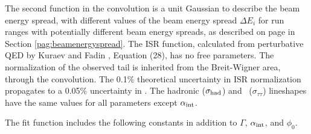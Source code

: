 \documentclass{cornell}
\begin{document}
The second function in the convolution is a unit Gaussian to describe
the beam energy spread, with different values of the beam energy
spread $\Delta E_i$ for run ranges with potentially different beam
energy spreads, as described on page \pageref{pag:beamenergyspread} in
Section \ref{pag:beamenergyspread}.  The ISR function, calculated from
perturbative QED by Kuraev and Fadin \cite{kf}, Equation (28), has no
free parameters.  The normalization of the observed tail is inherited
from the Breit-Wigner area, through the convolution.  The 0.1\%
theoretical uncertainty in ISR normalization propagates to a 0.05\%
uncertainty in \geehadtot.  The hadronic ($\sigma_{\mbox{\scriptsize had}}$) and
\tautau\ ($\sigma_{\tau\tau}$) lineshapes have the same values for all
parameters except $\alpha_{\mbox{\scriptsize int}}$.

The fit function includes the following constants in addition to
$\Gamma$, $\alpha_{\mbox{\scriptsize int}}$, and $\phi_0$.
\end{document}
